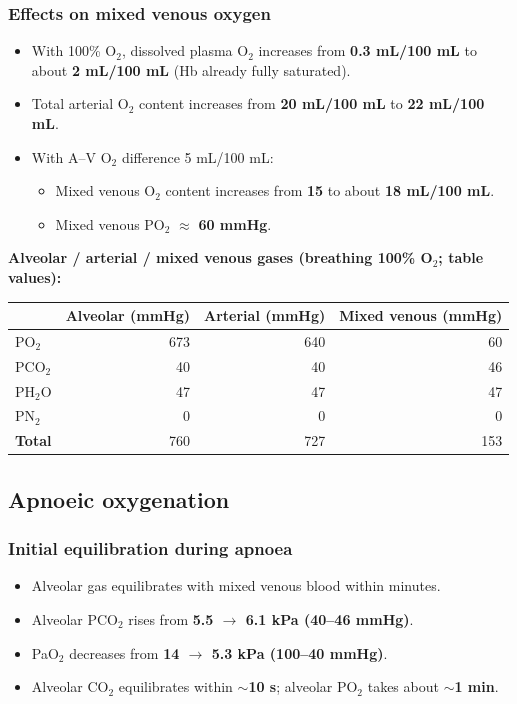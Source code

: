 \documentclass[11pt,a4paper]{article}
\begin{document}
\subsubsection{Effects on mixed venous oxygen}
\begin{itemize}
  \item With 100\% O$_2$, dissolved plasma O$_2$ increases from \textbf{0.3 mL/100 mL} to about \textbf{2 mL/100 mL} (Hb already fully saturated).
  \item Total arterial O$_2$ content increases from \textbf{20 mL/100 mL} to \textbf{22 mL/100 mL}.
  \item With A--V O$_2$ difference 5 mL/100 mL:
  \begin{itemize}
    \item Mixed venous O$_2$ content increases from \textbf{15} to about \textbf{18 mL/100 mL}.
    \item Mixed venous PO$_2$ $\approx$ \textbf{60 mmHg}.
  \end{itemize}
\end{itemize}

\textbf{Alveolar / arterial / mixed venous gases (breathing 100\% O$_2$; table values):}
\begin{center}
\begin{tabular}{lrrr}
\hline
 & \textbf{Alveolar (mmHg)} & \textbf{Arterial (mmHg)} & \textbf{Mixed venous (mmHg)} \\
\hline
PO$_2$ & 673 & 640 & 60 \\
PCO$_2$ & 40 & 40 & 46 \\
PH$_2$O & 47 & 47 & 47 \\
PN$_2$ & 0 & 0 & 0 \\
\textbf{Total} & 760 & 727 & 153 \\
\hline
\end{tabular}
\end{center}

\subsection{Apnoeic oxygenation}

\subsubsection{Initial equilibration during apnoea}
\begin{itemize}
  \item Alveolar gas equilibrates with mixed venous blood within minutes.
  \item Alveolar PCO$_2$ rises from \textbf{5.5 $\rightarrow$ 6.1 kPa (40--46 mmHg)}.
  \item PaO$_2$ decreases from \textbf{14 $\rightarrow$ 5.3 kPa (100--40 mmHg)}.
  \item Alveolar CO$_2$ equilibrates within \textbf{$\sim$10 s}; alveolar PO$_2$ takes about \textbf{$\sim$1 min}.
\end{itemize}
\end{document}
